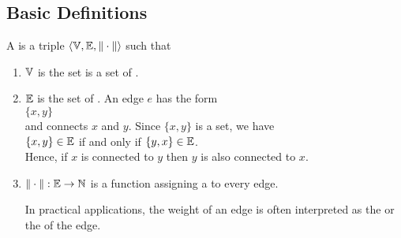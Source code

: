 \subsection{Basic Definitions}
\begin{Definition} A  is a triple 
   $\langle {\mathbb V}, {\mathbb E}, \|\cdot\| \rangle$ such that
  \begin{enumerate}
  \item ${\mathbb V}$ is the set is a set of  .
  \item ${\mathbb E}$ is the set of  .  An edge $e$ has the form
        \\[0.2cm]
        \hspace*{1.3cm}
        $\{x, y\}$
        \\[0.2cm]
        and connects $x$ and $y$.  Since $\{x,y\}$ is a set, we have
        \\[0.2cm]
        \hspace*{1.3cm}
        $\{x,y\} \in {\mathbb E}$ \quad if and only if $\{y,x\} \in {\mathbb E}$.
        \\[0.2cm]
        Hence, if $x$ is connected to $y$ then $y$ is also connected to $x$.
  \item $\|\cdot\|: {\mathbb E} \rightarrow {\mathbb N}$ is a function assigning a  to every edge.

        In practical applications, the weight of an edge is often interpreted as the  or the
         of the edge.
        \conclude
  \end{enumerate}
\end{Definition}

